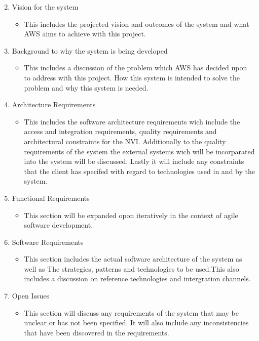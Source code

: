\documentclass[a4paper,12pt]{report}
\begin{document}
\begin{enumerate}
	 \setcounter{enumi}{1}
    \item Vision for the system
\begin{itemize}
    \item This includes the projected vision and outcomes of the system and what AWS aims to achieve with this project. 
\end{itemize}

    \item Background to why the system is being developed

\begin{itemize}
    \item This includes a discussion of the problem which AWS has decided upon to address with this project. How this system is intended to solve the problem and why this system is needed.
\end{itemize}
 
    \item Architecture Requirements
\setlength{\parindent}{2.5em}

\begin{itemize}
    \item This includes the software architecture requirements wich include the access and integration requirements, quality
requirements and architectural constraints for the NVI. Additionally to the quality requirements of the system the external systems wich will be incorparated into the system will be discussed. Lastly it will include any constraints that the client has
specifed with regard to technologies used in and by the system.
\end{itemize}


    \item Functional Requirements
\setlength{\parindent}{2.5em}

\begin{itemize}
    \item This section will be expanded opon iteratively in the context of agile software development.
\end{itemize}


    \item Software Requirements
\setlength{\parindent}{2.5em}

\begin{itemize}
    \item This section includes the actual software architecture of the system as well as The strategies, patterns and technologies to be used.This  also includes a discussion on reference technologies and intergration channels.
\end{itemize}



    \item Open Issues
\begin{itemize}
    \item This section will discuss any requirements of the system that may be unclear or has not been specified. It will also include any inconsistencies that have been discovered in the requirements. 
\end{itemize}
\end{enumerate}
\end{document}
